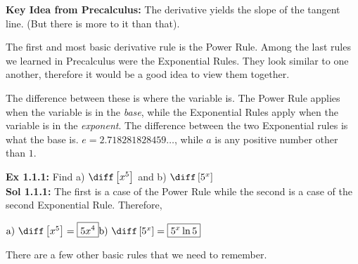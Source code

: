 \textbf{Key Idea from Precalculus:} The derivative yields the slope of the tangent line. (But there is more to it than that). \par
The first and most basic derivative rule is the Power Rule. Among the last rules we learned in Precalculus were the Exponential Rules. They look similar to one another, therefore it would be a good idea to view them together. 


\begin{center}
\end{center}


The difference between these is where the variable is. The Power Rule applies when the variable is in the \textit{base}, while the Exponential Rules apply when the variable is in the \textit{exponent}. The difference between the two Exponential rules is what the base is. $e = 2.718281828459 \dots$, while $a$ is any positive number other than $1$. \par 


\textbf{Ex 1.1.1:} Find a) $\diff\left[x^5\right]$ and b) $\diff\left[5^x\right]$ \\[11pt]
\textbf{Sol 1.1.1:} The first is a case of the Power Rule while the second is a case of the second Exponential Rule. Therefore, 
\begin{center}
$\hfill \text{a) } \diff\left[x^5\right] = \boxed{5x^4} \hfill \text{b) } \diff\left[5^x\right] = \boxed{5^x \ln{5}} \hfill$
\end{center}  

There are a few other basic rules that we need to remember. 

\begin{center}
\end{center}

